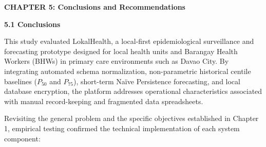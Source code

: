 \documentclass[
]{article}
\begin{document}
\textbf{CHAPTER 5: Conclusions and Recommendations}

\textbf{5.1 Conclusions}

This study evaluated LokalHealth, a local-first epidemiological
surveillance and forecasting prototype designed for local health units
and Barangay Health Workers (BHWs) in primary care environments such as
Davao City. By integrating automated schema normalization,
non-parametric historical centile baselines (\(P_{50}\) and \(P_{75}\)),
short-term Naïve Persistence forecasting, and local database encryption,
the platform addresses operational characteristics associated with
manual record-keeping and fragmented data spreadsheets.

Revisiting the general problem and the specific objectives established
in Chapter 1, empirical testing confirmed the technical implementation
of each system component:
\end{document}
